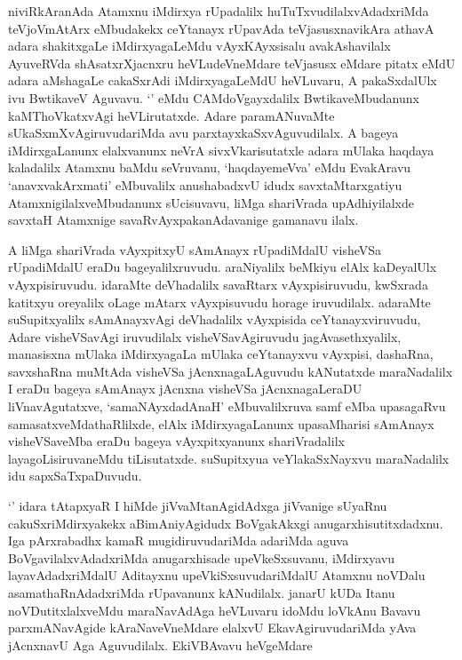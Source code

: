 \begin{artha}
niviRkAranAda Atamxnu iMdirxya rUpadalilx huTuTxvudilalxvAdadxriMda teVjoVmAtArx eMbudakekx ceYtanayx rUpavAda teVjasusxnavikAra athavA adara shakitxgaLe iMdirxyagaLeMdu vAyxKAyxsisalu avakAshavilalx AyuveRVda shAsatxrXjacnxru heVLudeVneMdare teVjasusx eMdare pitatx eMdU adara aMshagaLe cakaSxrAdi iMdirxyagaLeMdU heVLuvaru, A pakaSxdalUlx ivu BwtikaveV Aguvavu. `\stext ' eMdu CAMdoVgayxdalilx BwtikaveMbudanunx kaMThoVkatxvAgi heVLirutatxde. Adare paramANuvaMte sUkaSxmXvAgiruvudariMda avu parxtayxkaSxvAguvudilalx. A bageya iMdirxgaLanunx elalxvanunx neVrA sivxVkarisutatxle adara mUlaka haqdaya kaladalilx Atamxnu baMdu seVruvanu, `haqdayemeVva' eMdu EvakAravu `anavxvakArxmati' eMbuvalilx anushabadxvU idudx savxtaMtarxgatiyu AtamxnigilalxveMbudanunx sUcisuvavu, liMga shariVrada upAdhiyilalxde savxtaH Atamxnige savaRvAyxpakanAdavanige gamanavu ilalx. 
\end{artha}

\begin{artha}
A liMga shariVrada vAyxpitxyU sAmAnayx rUpadiMdalU visheVSa rUpadiMdalU eraDu bageyalilxruvudu. araNiyalilx beMkiyu elAlx kaDeyalUlx vAyxpisiruvudu. idaraMte deVhadalilx savaRtarx vAyxpisiruvudu, kwSxrada katitxyu oreyalilx oLage mAtarx vAyxpisuvudu horage iruvudilalx. adaraMte suSupitxyalilx sAmAnayxvAgi deVhadalilx vAyxpisida ceYtanayxviruvudu, Adare visheVSavAgi iruvudilalx visheVSavAgiruvudu jagAvasethxyalilx, manasisxna mUlaka iMdirxyagaLa mUlaka ceYtanayxvu vAyxpisi, dashaRna, savxshaRna muMtAda visheVSa jAcnxnagaLAguvudu kANutatxde maraNadalilx I eraDu bageya sAmAnayx jAcnxna visheVSa jAcnxnagaLeraDU liVnavAgutatxve, `samaNAyxdadAnaH' eMbuvalilxruva samf eMba upasagaRvu samasatxveMdathaRlilxde, elAlx iMdirxyagaLanunx upasaMharisi sAmAnayx visheVSaveMba eraDu bageya vAyxpitxyanunx shariVradalilx layagoLisiruvaneMdu tiLisutatxde. suSupitxyua veYlakaSxNayxvu maraNadalilx idu sapxSaTxpaDuvudu. 
\end{artha}

\begin{artha}%
`\stext ' idara tAtapxyaR I hiMde jiVvaMtanAgidAdxga jiVvanige sUyaRnu cakuSxriMdirxyakekx aBimAniyAgidudx BoVgakAkxgi anugarxhisutitxdadxnu. Iga pArxrabadhx kamaR mugidiruvudariMda adariMda aguva BoVgavilalxvAdadxriMda anugarxhisade upeVkeSxsuvanu, iMdirxyavu layavAdadxriMdalU Aditayxnu upeVkiSxsuvudariMdalU Atamxnu noVDalu asamathaRnAdadxriMda rUpavanunx kANudilalx. janarU kUDa Itanu noVDutitxlalxveMdu maraNavAdAga heVLuvaru idoMdu loVkAnu Bavavu parxmANavAgide kAraNaveVneMdare elalxvU EkavAgiruvudariMda yAva jAcnxnavU Aga Aguvudilalx. EkiVBAvavu heVgeMdare 
\end{artha}

